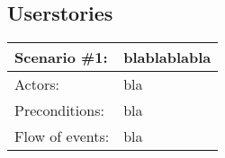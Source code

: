 \subsection{Userstories}

\begin{tabular}{| l | l |}
	\hline
	Scenario \#1: & blablablabla \\ \hline
	Actors: & bla \\ \hline
	Preconditions: & bla \\ \hline
	Flow of events: & bla \\ \hline
\end{tabular}